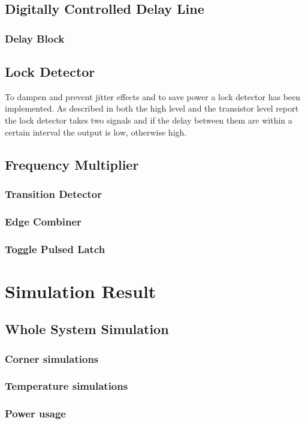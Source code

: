 \documentclass[a4paper,12pt]{article} \usepackage{graphicx}
\begin{document}
\subsection{Digitally Controlled Delay Line}
\subsubsection{Delay Block}
\subsection{Lock Detector}
To dampen and prevent jitter effects and to save power a lock detector
has been implemented. As described in both the high level and the
transistor level report the lock detector takes two signals and if
the delay between them are within a certain interval the output is
low, otherwise high.
\subsection{Frequency Multiplier}
\subsubsection{Transition Detector}
\subsubsection{Edge Combiner}
\subsubsection{Toggle Pulsed Latch}

\section{Simulation Result}
\subsection{Whole System Simulation}
\subsubsection{Corner simulations}
\subsubsection{Temperature simulations}
\subsubsection{Power usage}
\end{document}
